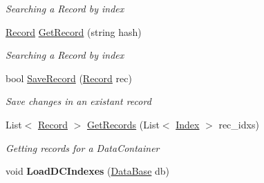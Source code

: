 \begin{DoxyCompactItemize}
\begin{DoxyCompactList}\small\item\em Searching a Record by index \end{DoxyCompactList}\item 
\hyperlink{class_dwarf_d_b_1_1_data_structures_1_1_record}{Record} \hyperlink{class_dwarf_d_b_1_1_chunk_manager_1_1_chunk_manager_a12bbf90b25cfa5ee7861e20ef6319710}{Get\+Record} (string hash)
\begin{DoxyCompactList}\small\item\em Searching a Record by index \end{DoxyCompactList}\item 
bool \hyperlink{class_dwarf_d_b_1_1_chunk_manager_1_1_chunk_manager_ae2d3285067ca56d3f8bc0806f9e3904a}{Save\+Record} (\hyperlink{class_dwarf_d_b_1_1_data_structures_1_1_record}{Record} rec)
\begin{DoxyCompactList}\small\item\em Save changes in an existant record \end{DoxyCompactList}\item 
List$<$ \hyperlink{class_dwarf_d_b_1_1_data_structures_1_1_record}{Record} $>$ \hyperlink{class_dwarf_d_b_1_1_chunk_manager_1_1_chunk_manager_a037839674d8248cade1ea666c9200d9f}{Get\+Records} (List$<$ \hyperlink{class_dwarf_d_b_1_1_data_structures_1_1_index}{Index} $>$ rec\+\_\+idxs)
\begin{DoxyCompactList}\small\item\em Getting records for a Data\+Container \end{DoxyCompactList}\item 
\hypertarget{class_dwarf_d_b_1_1_chunk_manager_1_1_chunk_manager_aa6b67f87244adbc8d5ef5297950ac49c}{void {\bfseries Load\+D\+C\+Indexes} (\hyperlink{class_dwarf_d_b_1_1_data_structures_1_1_data_base}{Data\+Base} db)}\label{class_dwarf_d_b_1_1_chunk_manager_1_1_chunk_manager_aa6b67f87244adbc8d5ef5297950ac49c}


\end{DoxyCompactItemize}
